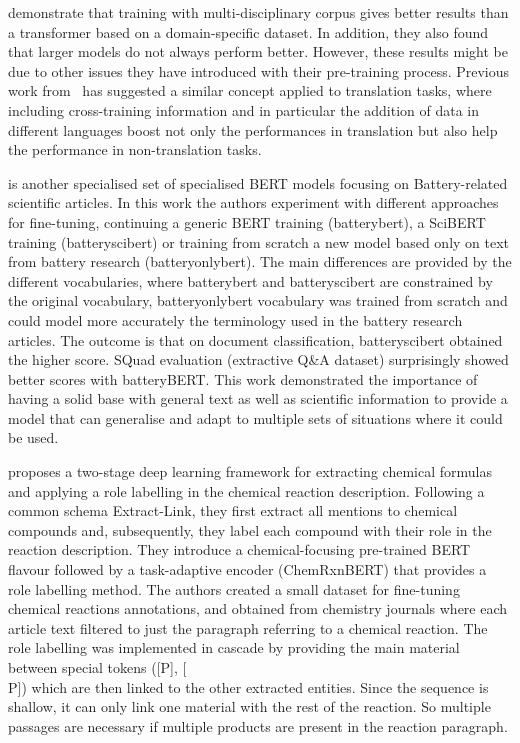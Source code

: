 \cite{hong2022ScholarBERT} demonstrate that training with multi-disciplinary corpus gives better results than a transformer based on a domain-specific dataset. In addition, they also found that larger models do not always perform better. However, these results might be due to other issues they have introduced with their pre-training process. 
Previous work from~\cite{lample2019cross} has suggested a similar concept applied to translation tasks, where  including cross-training information and in particular the addition of data in different languages boost not only the performances in translation but also help the performance in non-translation tasks. 

\cite{huang2020batterybert} is another specialised set of specialised BERT models focusing on Battery-related scientific articles. In this work the authors experiment with different approaches for fine-tuning, continuing a generic BERT training (batterybert), a SciBERT training (batteryscibert) or training from scratch a new model based only on text from battery research (batteryonlybert). The main differences are provided by the different vocabularies, where batterybert and batteryscibert are constrained by the original vocabulary, batteryonlybert vocabulary was trained from scratch and could model more accurately the terminology used in the battery research articles. 
The outcome is that on document classification, batteryscibert obtained the higher score. SQuad evaluation (extractive Q\&A dataset) surprisingly showed better scores with batteryBERT. This work demonstrated the importance of having a solid base with general text as well as scientific information to provide a model that can generalise and adapt to multiple sets of situations where it could be used. 

\cite{guo2021automated} proposes a two-stage deep learning framework for extracting chemical formulas and applying a role labelling in the chemical reaction description. 
Following a common schema Extract-Link, they first extract all mentions to chemical compounds and, subsequently, they label each compound with their role in the reaction description. 
They introduce a chemical-focusing pre-trained BERT flavour followed by a task-adaptive encoder (ChemRxnBERT) that provides a role labelling method. 
The authors created a small dataset for fine-tuning chemical reactions annotations, and obtained from chemistry journals where each article text filtered to just the paragraph referring to a chemical reaction. 
The role labelling was implemented in cascade by providing the main material between special tokens ([P], [\\P]) which are then linked to the other extracted entities. Since the sequence is shallow, it can only link one material with the rest of the reaction. So multiple passages are necessary if multiple products are present in the reaction paragraph.  

